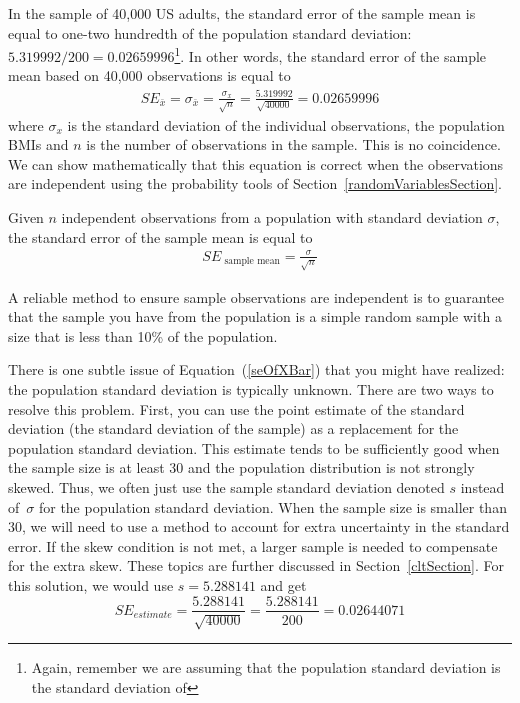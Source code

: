 In the sample of 40,000 US adults, the standard error of the sample mean is equal to one-two hundredth of the population standard deviation: $5.319992/200=0.02659996$\footnote{Again, remember we are assuming that the population standard deviation is the standard deviation of }. In other words, the standard error of the sample mean based on 40,000 observations is equal to
\begin{eqnarray*}
SE_{\bar{x}} = \sigma_{\bar{x}} = \frac{\sigma_{x}}{\sqrt{n}} = \frac{5.319992}{\sqrt{40000}} = 0.02659996
\end{eqnarray*}
where $\sigma_{x}$ is the standard deviation of the individual observations, the population BMIs and $n$ is the number of observations in the sample. This is no coincidence. We can show mathematically that this equation is correct when the observations are independent  using the probability tools of Section~\ref{randomVariablesSection}.

\begin{termBox}{
Given $n$ independent observations from a population with standard deviation $\sigma$, the standard error of the sample mean is equal to \vspace{-1mm}
\begin{eqnarray}
SE_{\text{ sample mean}} = \frac{\sigma}{\sqrt{n}}
\label{seOfXBar}
\end{eqnarray}\vspace{-3mm}%

A reliable method to ensure sample observations are independent is to guarantee that the sample you have from the population is a simple random sample with a size that is less than 10\% of the population.
}
\end{termBox}

There is one subtle issue of Equation~(\ref{seOfXBar}) that you might have realized: the population standard deviation is typically unknown. There are two ways to resolve this problem. First, you can use the point estimate of the standard deviation (the standard deviation of the sample) as a replacement for the population standard deviation. This estimate tends to be sufficiently good when the sample size is at least 30 and the population distribution is not strongly skewed. Thus, we often just use the sample standard deviation denoted $s$ instead of~$\sigma$ for the population standard deviation. When the sample size is smaller than 30, we will need to use a method to account for extra uncertainty in the standard error. If the skew condition is not met, a larger sample is needed to compensate for the extra skew. These topics are further discussed in Section~\ref{cltSection}. For this solution, we would use $s= 5.288141$ and get  \[SE_{estimate}=\frac{5.288141}{\sqrt{40000}}=\frac{5.288141}{200}=0.02644071\]

